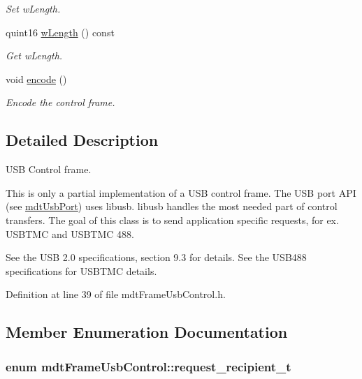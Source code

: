 \begin{DoxyCompactItemize}
\begin{DoxyCompactList}\small\item\em Set wLength. \end{DoxyCompactList}\item 
\hypertarget{classmdt_frame_usb_control_a4c69a912c9ef404fb5f019698d676e52}{
quint16 \hyperlink{classmdt_frame_usb_control_a4c69a912c9ef404fb5f019698d676e52}{wLength} () const }
\label{classmdt_frame_usb_control_a4c69a912c9ef404fb5f019698d676e52}

\begin{DoxyCompactList}\small\item\em Get wLength. \end{DoxyCompactList}\item 
void \hyperlink{classmdt_frame_usb_control_af60cb9e9fd8cb55fc44d696fce0331c0}{encode} ()
\begin{DoxyCompactList}\small\item\em Encode the control frame. \end{DoxyCompactList}\end{DoxyCompactItemize}


\subsection{Detailed Description}
USB Control frame. 

This is only a partial implementation of a USB control frame. The USB port API (see \hyperlink{classmdt_usb_port}{mdtUsbPort}) uses libusb. libusb handles the most needed part of control transfers. The goal of this class is to send application specific requests, for ex. USBTMC and USBTMC 488.

See the USB 2.0 specifications, section 9.3 for details. See the USB488 specifications for USBTMC details. 

Definition at line 39 of file mdtFrameUsbControl.h.



\subsection{Member Enumeration Documentation}
\hypertarget{classmdt_frame_usb_control_aaf1f08b1b5e47ab18426800ed0accbde}{
\subsubsection[{request\_\-recipient\_\-t}]{\setlength{\rightskip}{0pt plus 5cm}enum {\bf mdtFrameUsbControl::request\_\-recipient\_\-t}}}
\label{classmdt_frame_usb_control_aaf1f08b1b5e47ab18426800ed0accbde}


